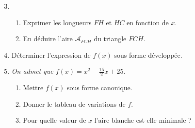 \documentclass[11pt]{article}
\begin{document}
\begin{exo}[$6$ points]
\begin{minipage}{.5\textwidth}
\begin{center}
\end{center}
\end{minipage}
\begin{enumerate}
    \setcounter{enumi}{2}
  \item \begin{enumerate}
      \item Exprimer les longueurs $FH$ et $HC$ en fonction de $x$.
      \item En déduire l'aire $\mathcal A_{FCH}$ du triangle $FCH$.
    \end{enumerate}
  \item Déterminer l'expression de $f(x)$ sous forme développée.
  \item \emph{On admet que $f(x) = x^2-\frac{15}{2}x+25$.}
    \begin{enumerate}
      \item Mettre $f(x)$ sous forme canonique.
      \item Donner le tableau de variations de $f$.
      \item Pour quelle valeur de $x$ l'aire blanche est-elle minimale ?
    \end{enumerate}  
\end{enumerate}
\end{exo}
\end{document}
